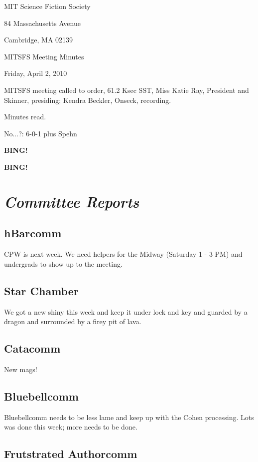 \documentclass[10pt]{article}
\newcommand{\bing}{{\bf BING!} }
\newcommand{\goto}[1]{\bing \vskip 12pt \section*{{\em{#1}}}}
\newcommand{\ps}{ plus Spehn\xspace}
\newcommand{\skinner}{Miss Katie Ray, President and Skinner}
\newcommand{\onseck}{Kendra Beckler, Onseck}
\newcommand{\meetingdate}{Friday, April 2, 2010}
\begin{document}
\begin{center}

MIT Science Fiction Society

84 Massachusetts Avenue

Cambridge, MA 02139

\vspace{12pt}

MITSFS Meeting Minutes

\meetingdate

\end{center}

\vspace{18pt}

\setlength{\parskip}{6pt}

\noindent
MITSFS meeting called to order, 61.2 Ksec SST,
\skinner, presiding; \onseck, recording.

Minutes read.

No...?: 6-0-1 \ps

\bing

\goto{Committee Reports}

\subsection*{hBarcomm}
CPW is next week.  We need helpers for the Midway (Saturday 1 - 3 PM) and 
undergrads to show up to the meeting.

\subsection*{Star Chamber}
We got a new shiny this week and keep it under lock and key and guarded by a 
dragon and surrounded by a firey pit of lava.

\subsection*{Catacomm}
New mags!

\subsection*{Bluebellcomm}
Bluebellcomm needs to be less lame and keep up with the Cohen processing.  Lots
was done this week; more needs to be done.

\subsection*{Frutstrated Authorcomm}
\end{document}
